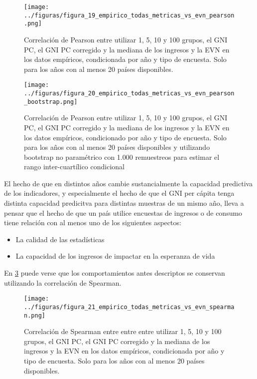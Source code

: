 \begin{figure}[H] %
    \centering %
    \texttt{[image: ../figuras/figura\_19\_empirico\_todas\_metricas\_vs\_evn\_pearson.png]} %
    \caption{Correlación de Pearson entre  utilizar 1, 5, 10 y 100 grupos, el GNI PC, el GNI PC corregido y la mediana de los ingresos y la EVN en los datos empíricos, condicionada por año y tipo de encuesta. Solo para los años con al menos 20 países disponibles.}
    \label{fig:19} %
\end{figure}

\begin{figure}[H] %
    \centering %
    \texttt{[image: ../figuras/figura\_20\_empirico\_todas\_metricas\_vs\_evn\_pearson\_bootstrap.png]} %
    \caption{Correlación de Pearson entre utilizar 1, 5, 10 y 100 grupos, el GNI PC, el GNI PC corregido y la mediana de los ingresos y la EVN en los datos empíricos, condicionado por año y tipo de encuesta. Solo para los años con al menos 20 países disponibles y utilizando bootstrap no paramétrico con 1.000 remuestreos para estimar el rango inter-cuartílico condicional}
    \label{fig:20} %
\end{figure}


El hecho de que en distintos años cambie sustancialmente la capacidad predictiva de los indicadores, y especialmente el hecho de que el GNI per cápita tenga distinta capacidad predicitva para distintas muestras de un mismo año, lleva a pensar que el hecho de que un país utilice encuestas de ingresos o de consumo tiene relación con al menos uno de los siguientes aspectos:
\begin{itemize}
    \item La calidad de las estadísticas
    \item La capacidad de los ingresos de impactar en la esperanza de vida
\end{itemize}


En \ref{fig:21} puede verse que los comportamientos antes descriptos se conservan utilizando la correlación de Spearman.

\begin{figure}[H] %
    \centering %
    \texttt{[image: ../figuras/figura\_21\_empirico\_todas\_metricas\_vs\_evn\_spearman.png]} %
    \caption{Correlación de Spearman entre entre entre utilizar 1, 5, 10 y 100 grupos, el GNI PC, el GNI PC corregido y la mediana de los ingresos y la EVN en los datos empíricos, condicionada por año y tipo de encuesta. Solo para los años con al menos 20 países disponibles.}
    \label{fig:21} %
\end{figure}



